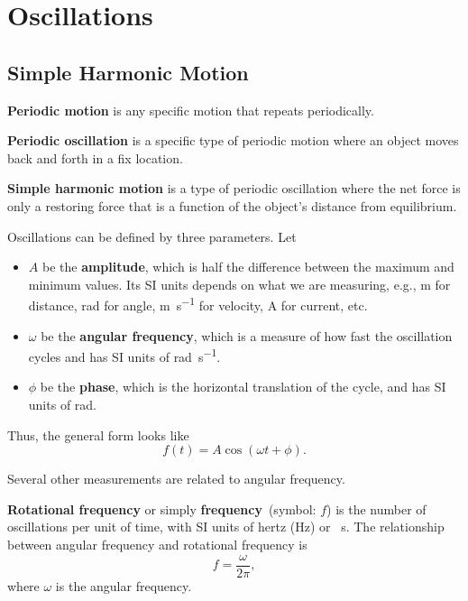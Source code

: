 \chapter{Oscillations}


\section{Simple Harmonic Motion}

\textbf{Periodic motion} is any specific motion that repeats periodically.

\textbf{Periodic oscillation} is a specific type of periodic motion
where an object moves back and forth in a fix location.

\textbf{Simple harmonic motion} is a type of periodic oscillation
where the net force is only a restoring force
that is a function of the object's distance from equilibrium.

Oscillations can be defined by three parameters.
Let
\begin{itemize}
    \item \(A\) be the \textbf{amplitude},
        which is half the difference between the maximum and minimum values.
        Its SI units depends on what we are measuring,
        e.g., \unit{\metre} for distance, \unit{\radian} for angle,
        \unit{\metre \per \second} for velocity,
        \unit{\ampere} for current, etc.
    \item \(\omega\) be the \textbf{angular frequency},
        which is a measure of how fast the oscillation cycles
        and has SI units of \unit{\radian \per \second}.
    \item \(\phi\) be the \textbf{phase},
        which is the horizontal translation of the cycle,
        and has SI units of \unit{\radian}.
\end{itemize}
Thus, the general form looks like
\begin{equation}
    f(t) = A \cos(\omega t + \phi).
\end{equation}

Several other measurements are related to angular frequency.

\textbf{Rotational frequency} or simply \textbf{frequency}~(symbol: \(f\))
is the number of oscillations per unit of time,
with SI units of hertz (\unit{\hertz}) or \unit{\per \second}.
The relationship between angular frequency and rotational frequency is
\begin{equation}
    f = \frac{\omega}{2 \pi},
\end{equation}
where \(\omega\) is the angular frequency.

